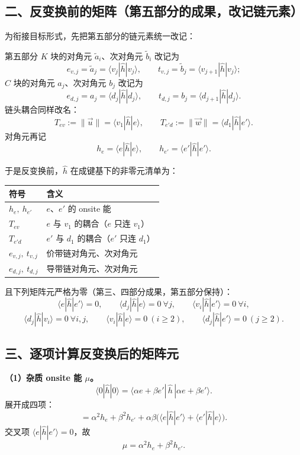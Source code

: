 \documentclass[11pt]{ctexart}
\begin{document}
\subsection{二、反变换前的矩阵（第五部分的成果，改记链元素）}

为衔接目标形式，先把第五部分的链元素统一改记：

第五部分 $K$ 块的对角元 $\tilde a_i$、次对角元 $\tilde b_i$ 改记为
\[
e_{v,j}=\tilde a_j=\langle v_j|\hat h|v_j\rangle,
\qquad
t_{v,j}=\tilde b_j=\langle v_{j+1}|\hat h|v_j\rangle;
\]
$C$ 块的对角元 $a_j$、次对角元 $b_j$ 改记为
\[
e_{d,j}=a_j=\langle d_j|\hat h|d_j\rangle,
\qquad
t_{d,j}=b_j=\langle d_{j+1}|\hat h|d_j\rangle .
\]
链头耦合同样改名：
\[
T_{ev}:=\|\vec u\|=\langle v_1|\hat h|e\rangle,
\qquad
T_{e'd}:=\|\vec w\|=\langle d_1|\hat h|e'\rangle .
\]
对角元再记
\[
h_e=\langle e|\hat h|e\rangle,
\qquad
h_{e'}=\langle e'|\hat h|e'\rangle .
\]

于是反变换前，$\hat h$ 在成键基下的非零元清单为：

\begin{center}
\begin{tabular}{ll}
\toprule
符号 & 含义\\
\midrule
$h_e,\ h_{e'}$ & $e$、$e'$ 的 onsite 能\\
$T_{ev}$ & $e$ 与 $v_1$ 的耦合（$e$ 只连 $v_1$）\\
$T_{e'd}$ & $e'$ 与 $d_1$ 的耦合（$e'$ 只连 $d_1$）\\
$e_{v,j},\ t_{v,j}$ & 价带链对角元、次对角元\\
$e_{d,j},\ t_{d,j}$ & 导带链对角元、次对角元\\
\bottomrule
\end{tabular}
\end{center}

且下列矩阵元严格为零（第三、四部分成果，第五部分保持）：
\[
\langle e|\hat h|e'\rangle=0,\qquad
\langle d_j|\hat h|e\rangle=0\ \forall j,\qquad
\langle v_i|\hat h|e'\rangle=0\ \forall i,
\]
\[
\langle d_j|\hat h|v_i\rangle=0\ \forall i,j,\qquad
\langle v_i|\hat h|e\rangle=0\ (i\ge2),\qquad
\langle d_j|\hat h|e'\rangle=0\ (j\ge2).
\]

\subsection{三、逐项计算反变换后的矩阵元}

\textbf{（1）杂质 onsite 能 $\mu$。}
\[
\langle0|\hat h|0\rangle
=
\langle \alpha e+\beta e'|\,\hat h\,|\alpha e+\beta e'\rangle .
\]
展开成四项：
\[
=
\alpha^2 h_e+\beta^2 h_{e'}
+\alpha\beta\Big(\langle e|\hat h|e'\rangle+\langle e'|\hat h|e\rangle\Big) .
\]
交叉项 $\langle e|\hat h|e'\rangle=0$，故
\[
\mu=\alpha^2 h_e+\beta^2 h_{e'} .
\]
\end{document}
